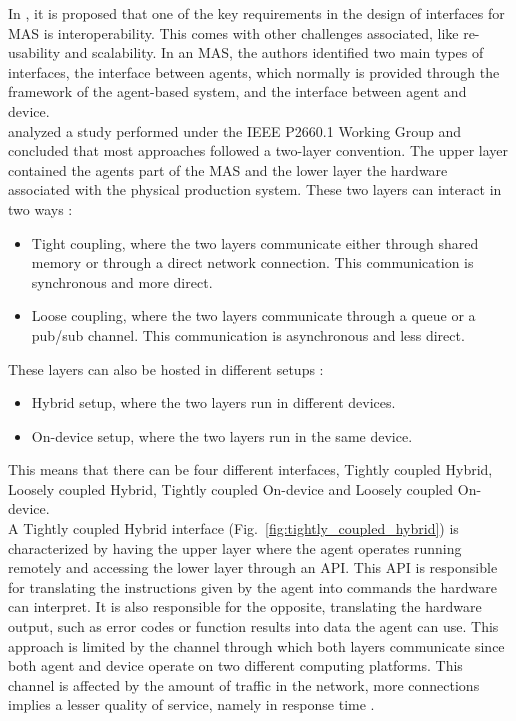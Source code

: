 In \cite{Karnouskos2019}, it is proposed that one of the key requirements in the design of interfaces for \gls{MAS} is interoperability. This comes with other challenges associated, like re-usability and scalability. In an \gls{MAS}, the authors identified two main types of interfaces, the interface between agents, which normally is provided through the framework of the agent-based system, and the interface between agent and device. \\


\citeauthor{8591641} \cite{8591641} analyzed a study performed under the IEEE P2660.1 Working Group \cite{9340089} and concluded that most approaches followed a two-layer convention. The upper layer contained the agents part of the MAS and the lower layer the hardware associated with the physical production system. These two layers can interact in two ways \cite{8591641}:
\begin{itemize}
	\item Tight coupling, where the two layers communicate either through shared memory or through a direct network connection. This communication is synchronous and more direct.
	\item Loose coupling, where the two layers communicate through a queue or a pub/sub channel. This communication is asynchronous and less direct.
\end{itemize}

These layers can also be hosted in different setups \cite{8591641}:
\begin{itemize}
	\item Hybrid setup, where the two layers run in different devices.
	\item On-device setup, where the two layers run in the same device. 
\end{itemize}

This means that there can be four different interfaces, Tightly coupled Hybrid, Loosely coupled Hybrid, Tightly coupled On-device and Loosely coupled On-device.\\

A Tightly coupled Hybrid interface (Fig.~\ref{fig:tightly_coupled_hybrid}) is characterized by having the upper layer where the agent operates running remotely and accessing the lower layer through an \gls{API}. This \gls{API} is responsible for translating the instructions given by the agent into commands the hardware can interpret. It is also responsible for the opposite, translating the hardware output, such as error codes or function results into data the agent can use. This approach is limited by the channel through which both layers communicate since both agent and device operate on two different computing platforms. This channel is affected by the amount of traffic in the network, more connections implies a lesser quality of service, namely in response time \cite{8591641}.\\


